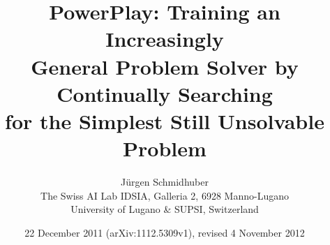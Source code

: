 \documentclass{article}
\begin{document}
\def\GM{G\"{o}del Machine }
\def\gm{G\"{o}del machine }
\def\GMn{G\"{o}del Machine}
\def\gmn{G\"{o}del machine}
\def\hs{Hsearch }
\date{}

\title{{\sc PowerPlay:} Training an Increasingly \\ General Problem Solver by Continually Searching \\ for the Simplest Still Unsolvable Problem}

\date{22 December 2011 (arXiv:1112.5309v1), revised 4 November 2012}
\author{J\"{u}rgen Schmidhuber \\
The Swiss AI Lab IDSIA, Galleria 2, 6928 Manno-Lugano \\
University of Lugano \& SUPSI, Switzerland}
\maketitle
\end{document}
